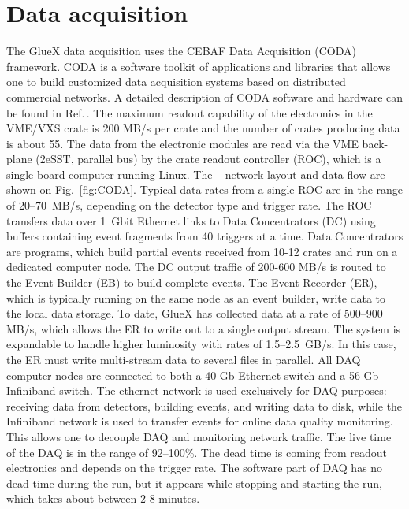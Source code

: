 
\section[Data Acquisition]{Data acquisition \label{sec:daq}}



The GlueX data acquisition uses the CEBAF Data Acquisition (CODA) framework. CODA is a software toolkit of applications and libraries that allows one to build customized data acquisition systems based on distributed commercial networks. A detailed description of CODA software and hardware can be found in Ref.\,\cite{CLAS12DAQ}. 
The maximum readout capability of the electronics in the VME/VXS crate is 200 MB/s per crate and the number of crates producing data is about 55.
The data from the electronic modules are read via the VME back-plane (2eSST, parallel bus) by the crate readout controller (ROC), which is a single board computer running Linux.
The \gx~ network layout and data flow are shown on Fig.~\ref{fig:CODA}.
Typical data rates from a single ROC are in the range of 20--70~MB/s, depending on the detector type and trigger rate.
The ROC transfers data over 1~Gbit Ethernet links to Data Concentrators (DC) using buffers containing event fragments from 40 triggers at a time. Data Concentrators are programs, which build partial events received from 10-12 crates and run on a dedicated computer node.
The DC output traffic of 200-600 MB/s is routed to the Event Builder (EB) to build complete events.
The Event Recorder (ER), which is typically running on the same node as an event builder, write data to the local data storage.
To date, GlueX has collected data at a rate of 500--900 MB/s, which allows the ER to write out to a single output stream. The system is expandable to handle higher luminosity with rates of 1.5--2.5~GB/s. In this case, the ER must write multi-stream data to several files in parallel.
All DAQ computer nodes are connected to both a 40 Gb Ethernet switch and a 56 Gb Infiniband switch.
The ethernet network is used exclusively for DAQ purposes: receiving data from detectors, building events, and writing data to disk, 
while the Infiniband network is used to transfer events for online data quality monitoring. 
This allows one to decouple DAQ and monitoring network traffic.
The live time of the DAQ is in the range of 92--100\%. The dead time is coming from readout electronics and depends on the trigger rate.  
The software part of DAQ has no dead time during the run, but it appears while stopping and starting the run, which takes about between 2-8 minutes. 



